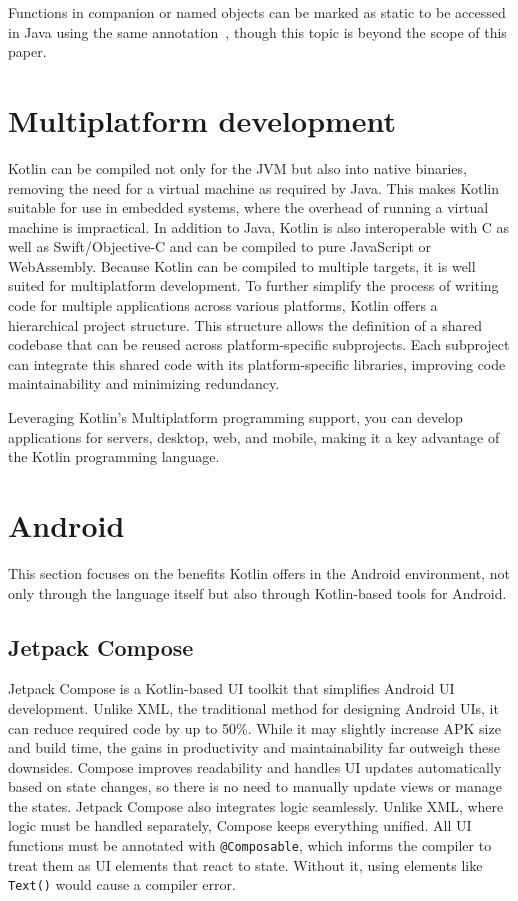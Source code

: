 \documentclass[a4paper,11pt]{article}
\begin{document}
Functions in companion or named objects can be marked as static to be accessed in Java using the same annotation~\cite{interop-static-fields}, though this topic is beyond the scope of this paper.

\section{Multiplatform development}
Kotlin can be compiled not only for the JVM but also into native binaries, removing the need for a virtual machine as required by Java. This makes Kotlin suitable for use in embedded systems, where the overhead of running a virtual machine is impractical. In addition to Java, Kotlin is also interoperable with C as well as Swift/Objective-C and can be compiled to pure JavaScript or WebAssembly. Because Kotlin can be compiled to multiple targets, it is well suited for multiplatform development. To further simplify the process of writing code for multiple applications across various platforms, Kotlin offers a hierarchical project structure. This structure allows the definition of a shared codebase that can be reused across platform-specific subprojects. Each subproject can integrate this shared code with its platform-specific libraries, improving code maintainability and minimizing redundancy.

Leveraging Kotlin's Multiplatform programming support, you can develop applications for servers, desktop, web, and mobile, making it a key advantage of the Kotlin programming language. 

\section{Android}
This section focuses on the benefits Kotlin offers in the Android environment, not only through the language itself but also through Kotlin-based tools for Android.

\subsection{Jetpack Compose}\label{sec:jetpack}
Jetpack Compose is a Kotlin-based UI toolkit that simplifies Android UI development. Unlike XML, the traditional method for designing Android UIs, it can reduce required code by up to 50\%. While it may slightly increase APK size and build time, the gains in productivity and maintainability far outweigh these downsides.
Compose improves readability and handles UI updates automatically based on state changes, so there is no need to manually update views or manage the states.
Jetpack Compose also integrates logic seamlessly. Unlike XML, where logic must be handled separately, Compose keeps everything unified.
All UI functions must be annotated with \texttt{@Composable}, which informs the compiler to treat them as UI elements that react to state. Without it, using elements like \texttt{Text()} would cause a compiler error.
\end{document}
